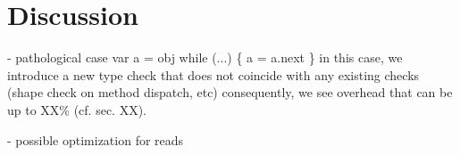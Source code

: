 
\section{Discussion}
\label{sec:discussion}


\begin{cnote}
- pathological case
  var a = obj
  while (...) \{
    a = a.next
  \}
  in this case, we introduce a new type check that does not coincide with any
  existing checks (shape check on method dispatch, etc)
  consequently, we see overhead that can be up to XX\% (cf. sec. XX).


- possible optimization for reads

\end{cnote}

